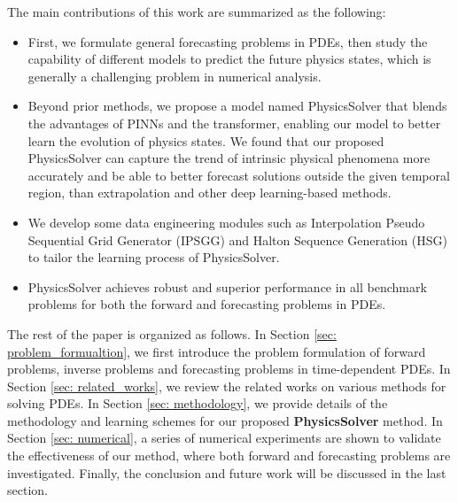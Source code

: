 \documentclass[preprint,11pt]{elsarticle}
\begin{document}
The main contributions of this work are summarized as the following: 
\vspace{-5pt}
\begin{itemize}
    \item First, we formulate general forecasting problems in PDEs, then study the capability of different models to predict the future physics states, which is generally a challenging problem in numerical analysis.
    \item Beyond prior methods, we propose a model named PhysicsSolver that blends the advantages of PINNs and the transformer, enabling our model to better learn the evolution of physics states. We found that our proposed PhysicsSolver can capture the trend of intrinsic physical phenomena more accurately and be able to better forecast solutions outside the given temporal region, than extrapolation and other deep learning-based methods.
    \item We develop some data engineering modules such as Interpolation Pseudo Sequential Grid Generator (IPSGG) and Halton Sequence Generation (HSG) to tailor the learning process of PhysicsSolver.
    \item PhysicsSolver achieves robust and superior performance in all benchmark problems for both the forward and forecasting problems in PDEs.
\end{itemize}

The rest of the paper is organized as follows. In Section \ref{sec: problem_formualtion}, we first introduce
the problem formulation of forward problems, inverse problems and forecasting problems in time-dependent PDEs. In Section \ref{sec: related_works}, we review the related works on various methods for solving PDEs. In Section \ref{sec: methodology}, 
we provide details of the methodology and learning schemes for our proposed \textbf{PhysicsSolver} method. In Section \ref{sec: numerical}, a series of numerical experiments are shown to validate the effectiveness of our method, where both forward and forecasting problems are investigated. Finally, the conclusion and future work will be discussed in the last section.
\end{document}
